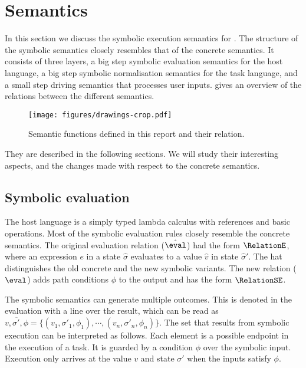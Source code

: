 
\section{Semantics}
\label{sec:semantics}

In this section we discuss the symbolic execution semantics for \TOPHAT.
The structure of the symbolic semantics closely resembles that of the concrete semantics.
It consists of three layers, a big step symbolic evaluation semantics for the host language, a big step symbolic normalisation semantics for the task language, and a small step driving semantics that processes user inputs.
 gives an overview of the relations between the different semantics.

\begin{figure}[h]
  \centering
  \texttt{[image: figures/drawings-crop.pdf]}
  \caption{
    Semantic functions defined in this report and their relation.
  }
  \label{fig:semantic-functions}
\end{figure}

They are described in the following sections.
We will study their interesting aspects, and the changes made with respect to the concrete semantics.



\subsection{Symbolic evaluation}

The host language is a simply typed lambda calculus with references and basic operations.
Most of the symbolic evaluation rules closely resemble the concrete semantics.
The original evaluation relation ($\hat{\eval}$) had the form $\RelationE$,
where an expression $e$ in a state $\hat{\sigma}$ evaluates to a value $\hat{v}$ in state $\hat{\sigma}'$.
The hat distinguishes the old concrete and the new symbolic variants.
The new relation ($\eval$) adds path conditions $\phi$ to the output and has the form $\RelationSE$.

The symbolic semantics can generate multiple outcomes.
This is denoted in the evaluation with a line over the result, which can be read as $\overline{v,\sigma',\phi} = \{(v_1,\sigma'_1,\phi_1),\cdots,(v_n,\sigma'_n,\phi_n)\}$.
The set that results from symbolic execution can be interpreted as follows.
Each element is a possible endpoint in the execution of a task.
It is guarded by a condition $\phi$ over the symbolic input.
Execution only arrives at the value $v$ and state $\sigma'$ when the inputs satisfy $\phi$.

